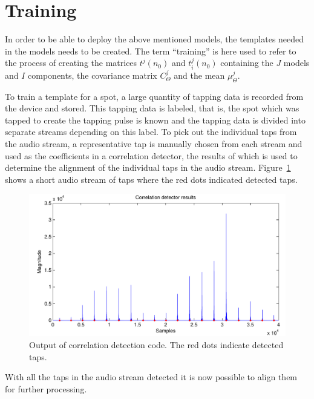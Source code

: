 \section{Training}
In order to be able to deploy the above mentioned models, the templates needed in the models needs to be created. The term ``training'' is here used to refer to the process of creating the matrices $t^j(n_0)$ and $t^j_i(n_0)$ containing the $J$ models and $I$ components, the covariance matrix $C^j_\Theta$ and the mean $\mu^j_\Theta$.

To train a template for a spot, a large quantity of tapping data is recorded from the device and stored. This tapping data is labeled, that is, the spot which was tapped to create the tapping pulse is known and the tapping data is divided into separate streams depending on this label. To pick out the individual taps from the audio stream, a representative tap is manually chosen from each stream and used as the coefficients in a correlation detector, the results of which is used to determine the alignment of the individual taps in the audio stream. Figure~\ref{fig:correlationDetect} shows a short audio stream of taps where the red dots indicated detected taps.

\begin{figure}[!]
\centering
\includegraphics[width=150mm]{correlationDetect.pdf}
\caption{Output of correlation detection code. The red dots indicate detected taps.}\label{fig:correlationDetect}
\end{figure}

With all the taps in the audio stream detected it is now possible to align them for further processing.

